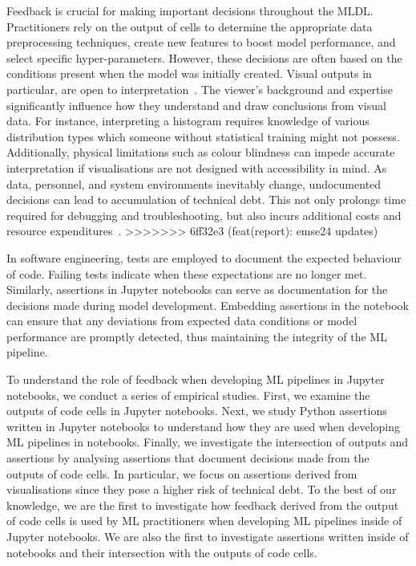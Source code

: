 Feedback is crucial for making important decisions throughout the MLDL. Practitioners rely on the output of cells to determine the appropriate data preprocessing techniques, create new features to boost model performance, and select specific hyper-parameters. However, these decisions are often based on the conditions present when the model was initially created. Visual outputs in particular, are open to interpretation~\cite{heer2010tour}. The viewer's background and expertise significantly influence how they understand and draw conclusions from visual data. For instance, interpreting a histogram requires knowledge of various distribution types which someone without statistical training might not possess. Additionally, physical limitations such as colour blindness can impede accurate interpretation if visualisations are not designed with accessibility in mind. As data, personnel, and system environments inevitably change, undocumented decisions can lead to accumulation of technical debt. This not only prolongs time required for debugging and troubleshooting, but also incurs additional costs and resource expenditures~\cite{sculley2015hidden,amershi2019software,sambasivan2021everyone}.
>>>>>>> 6ff32e3 (feat(report): emse24 updates)

In software engineering, tests are employed to document the expected behaviour of code. Failing tests indicate when these expectations are no longer met. Similarly, assertions in Jupyter notebooks can serve as documentation for the decisions made during model development. Embedding assertions in the notebook can ensure that any deviations from expected data conditions or model performance are promptly detected, thus maintaining the integrity of the ML pipeline.

To understand the role of feedback when developing ML pipelines in Jupyter notebooks, we conduct a series of  empirical studies. First, we examine the outputs of code cells in Jupyter notebooks. Next, we study Python assertions written in Jupyter notebooks to understand how they are used when developing ML pipelines in notebooks. Finally, we investigate the intersection of outputs and assertions by analysing  assertions that document decisions made from the outputs of code cells. In particular, we focus on assertions derived from visualisations since they pose a higher risk of technical debt. To the best of our knowledge, we are the first to investigate how feedback derived from the output of code cells is used by ML practitioners when developing ML pipelines inside of Jupyter notebooks. We are also the first to investigate assertions written inside of notebooks and their intersection with the outputs of code cells.

